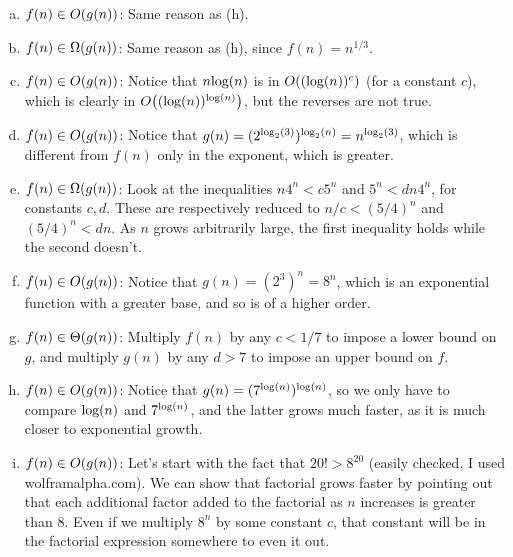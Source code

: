 \documentclass[11pt]{article}
\let\origleft\left
\let\origright\right
\renewcommand{\left}{\mathopen{}\mathclose\bgroup\origleft}
\renewcommand{\right}{\aftergroup\egroup\origright}
\newcommand{\p}[1]{\left(#1\right)}
\renewcommand{\log}[1]{\text{log}\p{#1}}
\newcommand{\logb}[2]{\text{log}_{#1}\p{#2}}
\newcommand{\BigOh}[1]{O\p{#1}}
\newcommand{\BigOmega}[1]{\Omega\p{#1}}
\newcommand{\BigTheta}[1]{\Theta\p{#1}}
\begin{document}
\begin{enumerate}[(a)]
\item $f(n) \in \BigOh{g(n)}$: Same reason as (h).
\item $f(n) \in \BigOmega{g(n)}$: Same reason as (h), since $f(n) = n^{1/3}$.
\item $f(n) \in \BigOh{g(n)}$: Notice that $n \log n$ is in $\BigOh{(\log n)^c}$ (for a constant $c$), which is clearly in $\BigOh{(\log n)^{\log n}}$, but the reverses are not true.
\item $f(n) \in \BigOh{g(n)}$: Notice that $g(n) = (2^{\logb 23})^{\logb 2n} = n^{\logb 23}$, which is different from $f(n)$ only in the exponent, which is greater.
\item $f(n) \in \BigOmega{g(n)}$: Look at the inequalities $n4^n < c5^n$ and $5^n < dn4^n$, for constants $c,d$. These are respectively reduced to $n/c < (5/4)^n$ and $(5/4)^n < dn$. As $n$ grows arbitrarily large, the first inequality holds while the second doesn't.
\item $f(n) \in \BigOh{g(n)}$: Notice that $g(n) = (2^3)^n = 8^n$, which is an exponential function with a greater base, and so is of a higher order.
\item $f(n) \in \BigTheta{g(n)}$: Multiply $f(n)$ by any $c < 1/7$ to impose a lower bound on $g$, and multiply $g(n)$ by any $d > 7$ to impose an upper bound on $f$.
\item $f(n) \in \BigOh{g(n)}$: Notice that $g(n) = (7^{\log n})^{\log n}$, so we only have to compare $\log n$ and $7^{\log n}$, and the latter grows much faster, as it is much closer to exponential growth.
\item $f(n) \in \BigOh{g(n)}$: Let's start with the fact that $20! > 8^{20}$ (easily checked, I used wolframalpha.com). We can show that factorial grows faster by pointing out that each additional factor added to the factorial as $n$ increases is greater than $8$. Even if we multiply $8^n$ by some constant $c$, that constant will be in the factorial expression somewhere to even it out.
\end{enumerate}


\newpage
\end{document}
